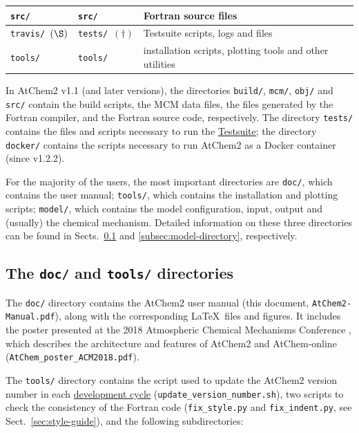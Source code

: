 \begin{table}[htb]
\begin{tabular}{llp{3.9cm}}
    \hline
    \texttt{src/}                    & \texttt{src/}                           & Fortran source files\\
    \hline
    \texttt{travis/}~$(\S)$          & \texttt{tests/}~$(\dag)$                & Testsuite scripts, logs and files\\
    \hline
    \texttt{tools/}                  & \texttt{tools/}                         & installation scripts, plotting tools and other utilities\\
  \end{tabular}
\end{table}

In AtChem2 v1.1 (and later versions), the directories \texttt{build/}, \texttt{mcm/},
\texttt{obj/} and \texttt{src/} contain the build scripts, the MCM data files, the files
generated by the Fortran compiler, and the Fortran source code, respectively.
The directory \texttt{tests/} contains the files and scripts necessary to run the
\hyperref[sec:testsuite]{Testsuite}; the directory \texttt{docker/} contains the scripts
necessary to run AtChem2 as a Docker container (since v1.2.2).

For the majority of the users, the most important directories are \texttt{doc/}, which
contains the user manual; \texttt{tools/}, which contains the installation and plotting
scripts; \texttt{model/}, which contains the model configuration, input, output and (usually)
the chemical mechanism. Detailed information on these three directories can be found in
Sects.~\ref{subsec:doc-tools-directories} and \ref{subsec:model-directory}, respectively.

\subsection{The \texttt{doc/} and \texttt{tools/} directories} \label{subsec:doc-tools-directories}

The \texttt{doc/} directory contains the AtChem2 user manual (this document,
\texttt{AtChem2-Manual.pdf}), along with the corresponding \LaTeX\ files and figures. It
includes the poster presented at the 2018 Atmospheric Chemical Mechanisms Conference
\citep{sommariva_2018}, which describes the architecture and features of AtChem2 and AtChem-online
(\texttt{AtChem\_poster\_ACM2018.pdf}).

The \texttt{tools/} directory contains the script used to update the AtChem2 version number
in each \hyperref[ch:development]{development cycle} (\texttt{update\_version\_number.sh}),
two scripts to check the consistency of the Fortran code (\texttt{fix\_style.py} and
\texttt{fix\_indent.py}, see Sect.~\ref{sec:style-guide}), and the following subdirectories:

